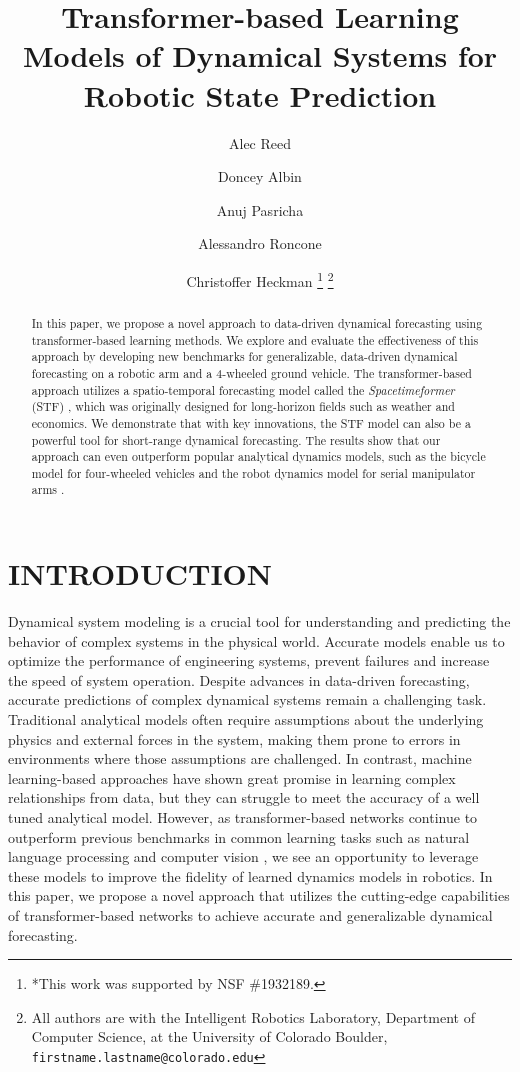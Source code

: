 \documentclass[letterpaper, 10 pt, conference]{ieeeconf}  %
\title{\LARGE \bf
Transformer-based Learning Models of Dynamical Systems for Robotic State Prediction
}
\author{Alec Reed \\ \and Doncey Albin \\ \and Anuj Pasricha \\ \and Alessandro Roncone \\ \and Christoffer Heckman%
\thanks{*This work was supported by NSF \#1932189.}%
\thanks{All authors are with the Intelligent Robotics Laboratory, Department of Computer Science, at the University of Colorado Boulder,
        {\tt\small firstname.lastname@colorado.edu}}%
}
\begin{document}
\maketitle
\thispagestyle{empty}
\pagestyle{empty}


\begin{abstract}
In this paper, we propose a novel approach to data-driven dynamical forecasting using transformer-based learning methods. We explore and evaluate the effectiveness of this approach by developing new benchmarks for generalizable, data-driven dynamical forecasting on a robotic arm and a 4-wheeled ground vehicle. The transformer-based approach utilizes a spatio-temporal forecasting model called the \emph{Spacetimeformer} (STF) \cite{grigsby2021longrange}, which was originally designed for long-horizon fields such as weather and economics. We demonstrate that with key innovations, the STF model can also be a powerful tool for short-range dynamical forecasting. The results show that our approach can even outperform popular analytical dynamics models, such as the bicycle model \cite{bikemodel} for four-wheeled vehicles and the robot dynamics model for serial manipulator arms \cite{gaz2019dynamic}.

\end{abstract}


\section{INTRODUCTION}

\label{sec1}

Dynamical system modeling is a crucial tool for understanding and predicting the behavior of complex systems in the physical world. Accurate models enable us to optimize the performance of engineering systems, prevent failures and increase the speed of system operation. Despite advances in data-driven forecasting, accurate predictions of complex dynamical systems remain a challenging task. Traditional analytical models often require assumptions about the underlying physics and external forces in the system, making them prone to errors in environments where those assumptions are challenged. In contrast, machine learning-based approaches have shown great promise in learning complex relationships from data, but they can struggle to meet the accuracy of a well tuned analytical model. However, as transformer-based networks continue to outperform previous benchmarks in common learning tasks such as natural language processing \cite{VaswaniAttentionisAll,DevlinBert} and computer vision \cite{Image_tx_Dosovitskiy,visionRadford}, we see an opportunity to leverage these models to improve the fidelity of learned dynamics models in robotics. In this paper, we propose a novel approach that utilizes the cutting-edge capabilities of transformer-based networks to achieve accurate and generalizable dynamical forecasting.
\end{document}
